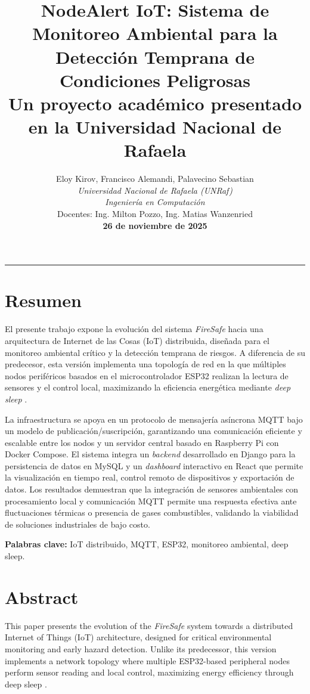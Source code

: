 \documentclass[11pt,a4paper]{article}
\title{\textbf{\LARGE NodeAlert IoT: Sistema de Monitoreo Ambiental para la Detección Temprana de Condiciones Peligrosas}\\[1cm]
\large Un proyecto académico presentado en la Universidad Nacional de Rafaela\\[3cm]}
\author{
\Large Eloy Kirov, Francisco Alemandi, Palavecino Sebastian\\[0.5cm]
\textit{Universidad Nacional de Rafaela (UNRaf)}\\
\textit{Ingeniería en Computación}\\[0.5cm]
Docentes: Ing. Milton Pozzo, Ing. Matias Wanzenried\\[1cm]
\textbf{26 de noviembre de 2025}
}
\date{}
\begin{document}
\maketitle
\thispagestyle{empty}
\newpage


\vspace{-0.5cm}
\begin{center}
\rule{8cm}{0.4pt}
\end{center}
\vspace{0.3cm}

\section{Resumen}
El presente trabajo expone la evolución del sistema \textit{FireSafe} hacia una arquitectura de Internet de las Cosas (IoT) distribuida, diseñada para el monitoreo ambiental crítico y la detección temprana de riesgos. A diferencia de su predecesor, esta versión implementa una topología de red en la que múltiples nodos periféricos basados en el microcontrolador ESP32 realizan la lectura de sensores y el control local, maximizando la eficiencia energética mediante \textit{deep sleep} \citep{valvano2014volume1}. 

La infraestructura se apoya en un protocolo de mensajería asíncrona MQTT bajo un modelo de publicación/suscripción, garantizando una comunicación eficiente y escalable entre los nodos y un servidor central basado en Raspberry Pi con Docker Compose. El sistema integra un \textit{backend} desarrollado en Django para la persistencia de datos en MySQL y un \textit{dashboard} interactivo en React que permite la visualización en tiempo real, control remoto de dispositivos y exportación de datos. Los resultados demuestran que la integración de sensores ambientales con procesamiento local y comunicación MQTT permite una respuesta efectiva ante fluctuaciones térmicas o presencia de gases combustibles, validando la viabilidad de soluciones industriales de bajo costo.

\textbf{Palabras clave:} IoT distribuido, MQTT, ESP32, monitoreo ambiental, deep sleep.

\vspace{0.5cm}
\section{Abstract}
This paper presents the evolution of the \textit{FireSafe} system towards a distributed Internet of Things (IoT) architecture, designed for critical environmental monitoring and early hazard detection. Unlike its predecessor, this version implements a network topology where multiple ESP32-based peripheral nodes perform sensor reading and local control, maximizing energy efficiency through deep sleep \citep{valvano2014volume1}. 
\end{document}
